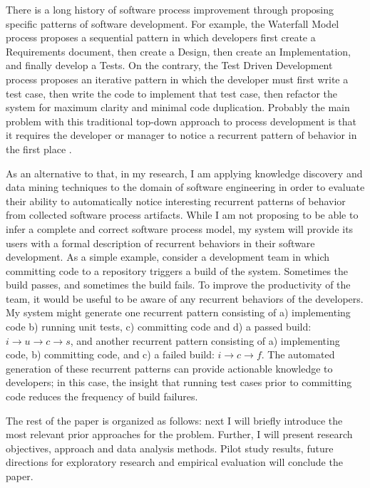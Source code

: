 \documentclass{sig-alternate}
\begin{document}
There is a long history of software process improvement through proposing specific patterns of software development. For example, the Waterfall Model process proposes a sequential pattern in which developers first create a Requirements document, then create a Design, then create an Implementation, and finally develop a Tests. On the contrary, the Test Driven Development process proposes an iterative pattern in which the developer must first write a test case, then write the code to implement that test case, then refactor the system for maximum clarity and minimal code duplication. Probably the main problem with this traditional top-down approach to process development is that it requires the developer or manager to notice a recurrent pattern of behavior in the first place \cite{citeulike:5043104}. 

As an alternative to that, in my research, I am applying knowledge discovery and data mining techniques to the domain of software engineering in order to evaluate their ability to automatically notice interesting recurrent patterns of behavior from collected software process artifacts. While I am not proposing to be able to infer a complete and correct software process model, my system will provide its users with a formal description of recurrent behaviors in their software development. As a simple example, consider a development team in which committing code to a repository triggers a build of the system. Sometimes the build passes, and sometimes the build fails. To improve the productivity of the team, it would be useful to be aware of any recurrent behaviors of the developers. My system might generate one recurrent pattern consisting of a) implementing code b) running unit tests, c) committing code and d) a passed build: $i \rightarrow u \rightarrow c \rightarrow s $, and another recurrent pattern consisting of a) implementing code, b) committing code, and c) a failed build: $i \rightarrow c \rightarrow f $. The automated generation of these recurrent patterns can provide actionable knowledge to developers; in this case, the insight that running test cases prior to committing code reduces the frequency of build failures.

The rest of the paper is organized as follows: next I will briefly introduce the most relevant prior approaches for the problem. Further, I will present research objectives, approach and data analysis methods. Pilot study results, future directions for exploratory research and empirical evaluation will conclude the paper.
\end{document}
